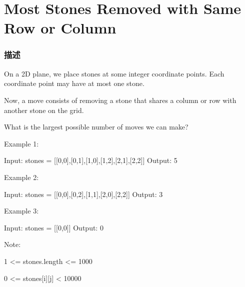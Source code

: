 \section{Most Stones Removed with Same Row or Column} %
\label{sec:most-stones-removed-with-same-row-or-column}


\subsubsection{描述}
On a 2D plane, we place stones at some integer coordinate points.  Each coordinate point may have at most one stone.

Now, a move consists of removing a stone that shares a column or row with another stone on the grid.

What is the largest possible number of moves we can make?

Example 1:
\begin{Code}
Input: stones = [[0,0],[0,1],[1,0],[1,2],[2,1],[2,2]]
Output: 5
\end{Code}

Example 2:
\begin{Code}
Input: stones = [[0,0],[0,2],[1,1],[2,0],[2,2]]
Output: 3
\end{Code}

Example 3:
\begin{Code}
Input: stones = [[0,0]]
Output: 0
\end{Code}

Note:
\begindot
\item 1 <= stones.length <= 1000
\item 0 <= stones[i][j] < 10000
\myenddot


